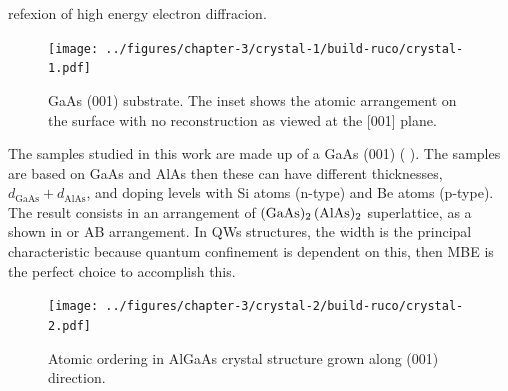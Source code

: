 refexion of high energy electron diffracion\cite{orton2015molecular,grundmann2010physics}.
\begin{figure}[H]
	\centering
	\texttt{[image: ../figures/chapter-3/crystal-1/build-ruco/crystal-1.pdf]}
	\caption[GaAs substrate growth direction]{GaAs (001) substrate. The inset shows the atomic arrangement on the surface with no reconstruction as viewed at the [001] plane.
	}
	\label{fig:chapter-3 GaAs Substrate}
\end{figure}

The samples studied in this work are made up of a GaAs (001) ( ).  The samples are based on  GaAs and AlAs then these can have different thicknesses, $d_{\mathrm{GaAs}} + d_{\mathrm{AlAs}}$, and doping levels with Si atoms (n-type) and Be atoms (p-type).
The result consists in an arrangement of $(\displaystyle\text{\normalfont GaAs})_{2}\,(\displaystyle\text{\normalfont AlAs})_{2}$ superlattice,  as a  shown in   or AB arrangement. In \gls{QW}s structures, the width is the principal characteristic because quantum confinement is dependent on this, then MBE is the perfect choice to accomplish this.  
\begin{figure}[hbtp!]
	\centering
	\texttt{[image: ../figures/chapter-3/crystal-2/build-ruco/crystal-2.pdf]}
	\caption[AlGaAs superlattice]{Atomic ordering in AlGaAs crystal structure grown  along (001) direction. }
	\label{fig:chapter-3 AlGaAs Cell}
\end{figure}

